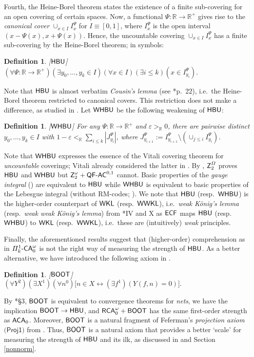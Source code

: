\documentclass[reqno]{amsart}
\newtheorem{defi}[thm]{Definition}
\newcommand\be{\begin{equation}}
\def\bdefi{\begin{defi}\rm}
\def\edefi{\end{defi}}
\def\SIXK{\Pi_{k}^{1}\text{-\textsf{\textup{CA}}}_{0}^{\omega}}
\def\Z{\textup{\textsf{Z}}}
\def\RCAo{\textup{\textsf{RCA}}_{0}^{\omega}}
\def\WKL{\textup{\textsf{WKL}}}
\def\WWKL{\textup{\textsf{WWKL}}}
\def\R{{\mathbb  R}}
\def\di{\rightarrow}
\def\asa{\leftrightarrow}
\def\ACA{\textup{\textsf{ACA}}}
\def\QFAC{\textup{\textsf{QF-AC}}}
\def\HBU{\textup{\textsf{HBU}}}
\def\BOOT{\textup{\textsf{BOOT}}}
\def\WHBU{\textup{\textsf{WHBU}}}
\def\eps{\varepsilon}
\def\ECF{\textup{\textsf{ECF}}}
\numberwithin{equation}{section}
\numberwithin{thm}{section}
\begin{document}
Fourth, the Heine-Borel theorem states the existence of a finite sub-covering for an open covering of certain spaces. 
Now, a functional $\Psi:\R\di \R^{+}$ gives rise to the \emph{canonical cover} $\cup_{x\in I} I_{x}^{\Psi}$ for $I\equiv [0,1]$, where $I_{x}^{\Psi}$ is the open interval $(x-\Psi(x), x+\Psi(x))$.  
Hence, the uncountable covering $\cup_{x\in I} I_{x}^{\Psi}$ has a finite sub-covering by the Heine-Borel theorem; in symbols:
\bdefi[$\HBU$]
$(\forall \Psi:\R\di \R^{+})(\exists  y_{0}, \dots, y_{k}\in I){(\forall x\in I)}(\exists i\leq k)(x\in I_{y_{i}}^{\Psi}).$
\edefi
Note that $\HBU$ is almost verbatim \emph{Cousin's lemma} (see \cite{cousin1}*{p.\ 22}), i.e.\ the Heine-Borel theorem restricted to canonical covers.  
This restriction does not make a difference, as studied in \cite{sahotop}.
Let $\WHBU$ be the following weakening of $\HBU$:
\bdefi[$\WHBU$] For any $\Psi:\R\di \R^{+} $ and $ \eps>_{\R}0$, there are pairwise distinct $ y_{0}, \dots, y_{k}\in I$ with $1-\eps <_{\R}\sum_{i\leq k}|J_{y_{i}}^{\Psi}| $, where $J_{y_{i+1}}^{\Psi}:= I_{y_{i+1}}^{\Psi}\setminus (\cup_{j\leq i}I_{y_{i}}^{\Psi}) $.
\edefi
Note that $\WHBU$ expresses the essence of the Vitali covering theorem for \emph{uncountable} coverings; Vitali already
considered the latter in \cite{vitaliorg}.  
By \cite{dagsamIII, dagsamV,dagsamVI}, $\Z_{2}^{\Omega}$ proves $\HBU$ and $\WHBU$ but $\Z_{2}^{\omega}+\QFAC^{0,1}$ cannot.
Basic properties of the \emph{gauge integral} (\cite{zwette, mullingitover}) are equivalent to $\HBU$ while $\WHBU$ is equivalent to basic properties of the Lebesgue integral (without RM-codes; \cite{dagsamVI}).  
We note that $\HBU$ (resp.\ $\WHBU$) is the higher-order counterpart of $\WKL$ (resp.\ $\WWKL$), i.e.\ \emph{weak K\"onig's lemma} (resp.\ \emph{weak weak K\"onig's lemma}) from \cite{simpson2}*{IV and X} as $\ECF$ maps $\HBU$ (resp.\ $\WHBU$) to $\WKL$ (resp.\ $\WWKL$), i.e.\ these are (intuitively) \emph{weak} principles. 

\smallskip

Finally, the aforementioned results suggest that (higher-order) comprehension as in $\SIXK$ is not the right way of measuring the strength of $\HBU$. 
As a better alternative, we have introduced the following axiom in \cite{samph}.
 \bdefi[$\BOOT$]
$(\forall Y^{2})(\exists X^{1})(\forall n^{0})\big[ n\in X \asa (\exists f^{1})(Y(f, n)=0)    \big]. $
\edefi
By \cite{samph}*{\S3}, $\BOOT$ is equivalent to convergence theorems for \emph{nets}, we have the implication $\BOOT\di \HBU$, and $\RCAo+\BOOT$ has the same first-order strength as $\ACA_{0}$.  
Moreover, $\BOOT$ is a natural fragment of Feferman's \emph{projection axiom} $\textsf{(Proj1)}$ from \cite{littlefef}.
Thus, $\BOOT$ is a natural axiom that provides a better `scale' for measuring the strength of $\HBU$ and its ilk, as discussed in \cite{samph} and Section \ref{nonnorm}.
\end{document}
